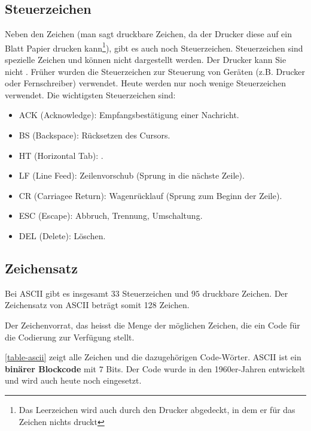 \subsection{Steuerzeichen}

Neben den  Zeichen (man sagt druckbare Zeichen, da der Drucker diese auf ein Blatt Papier drucken kann\footnote{Das Leerzeichen wird auch durch den Drucker abgedeckt, in dem er für das Zeichen nichts druckt}), gibt es auch noch Steuerzeichen. Steuerzeichen sind spezielle Zeichen und können nicht dargestellt werden. Der Drucker kann Sie nicht . Früher wurden die Steuerzeichen zur Steuerung von Geräten (z.B. Drucker oder Fernschreiber) verwendet. Heute werden nur noch wenige Steuerzeichen verwendet. Die wichtigsten Steuerzeichen sind:

\begin{itemize}
\item ACK (Acknowledge): Empfangsbestätigung einer Nachricht.
\item BS (Backspace): Rücksetzen des Cursors.
\item HT (Horizontal Tab): .
\item LF (Line Feed): Zeilenvorschub (Sprung in die nächste Zeile).
\item CR (Carriagee Return):  Wagenrücklauf (Sprung zum Beginn der Zeile).
\item ESC (Escape): Abbruch, Trennung, Umschaltung.
\item DEL (Delete): Löschen.
\end{itemize}

\subsection{Zeichensatz}

Bei \ac{ASCII} gibt es insgesamt $33$ Steuerzeichen und $95$ druckbare Zeichen. Der Zeichensatz von \ac{ASCII} beträgt somit 128 Zeichen.

\begin{definition}[Zeichensatz]
Der Zeichenvorrat, das heisst die Menge der möglichen Zeichen, die ein Code für die Codierung zur Verfügung stellt.
\end{definition}

\autoref{table-ascii} zeigt alle Zeichen und die dazugehörigen Code-Wörter. \ac{ASCII} ist ein \textbf{binärer Blockcode} mit $7$ Bits. Der Code wurde in den 1960er-Jahren entwickelt und wird auch heute noch eingesetzt.

